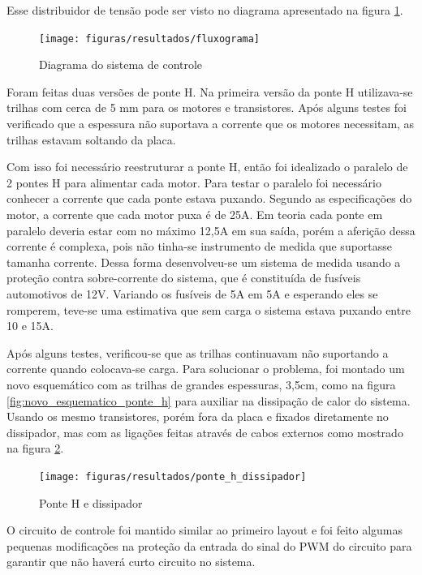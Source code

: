 Esse distribuidor de tensão pode ser visto no diagrama apresentado na figura \ref{fig:diagrama_controle}.

\begin{figure}[!htb]
	\centering
	\texttt{[image: figuras/resultados/fluxograma]}
	\caption{Diagrama do sistema de controle}
	\label{fig:diagrama_controle}
\end{figure}

Foram feitas duas versões de ponte H. Na primeira versão da ponte H utilizava-se trilhas com cerca de 5 mm para os motores e transistores. Após alguns testes foi verificado que a espessura não suportava a corrente que os motores necessitam, as trilhas estavam soltando da placa.

Com isso foi necessário reestruturar a ponte H, então foi idealizado o paralelo de 2 pontes H para alimentar cada motor. Para testar o paralelo foi necessário conhecer a corrente que cada ponte estava puxando. Segundo as especificações do motor, a corrente que cada motor puxa é de 25A. Em teoria cada ponte em paralelo deveria estar com no máximo 12,5A em sua saída, porém a aferição dessa corrente é complexa, pois não tinha-se instrumento de medida que suportasse tamanha corrente. Dessa forma desenvolveu-se um sistema de medida usando a proteção contra sobre-corrente do sistema, que é constituída de fusíveis automotivos de 12V. Variando os fusíveis de 5A em 5A e esperando eles se romperem, teve-se uma estimativa que sem carga o sistema estava puxando entre 10 e 15A.

Após alguns testes, verificou-se que as trilhas continuavam não suportando a corrente quando colocava-se carga. Para solucionar o problema, foi montado um novo esquemático com as trilhas de grandes espessuras, 3,5cm, como na figura \ref{fig:novo_esquematico_ponte_h} para auxiliar na dissipação de calor do sistema. Usando os mesmo transistores, porém fora da placa e fixados diretamente no dissipador, mas com as ligações feitas através de cabos externos como mostrado na figura \ref{fig:ponte_h_dissipador}.

\begin{figure}[!ht]
  \center
  \texttt{[image: figuras/resultados/ponte\_h\_dissipador]}
  \caption{Ponte H e dissipador}
  \label{fig:ponte_h_dissipador}
\end{figure}


O circuito de controle foi mantido similar ao primeiro layout e foi feito algumas pequenas modificações na proteção da entrada do sinal do PWM do circuito para garantir que não haverá curto circuito no sistema.

